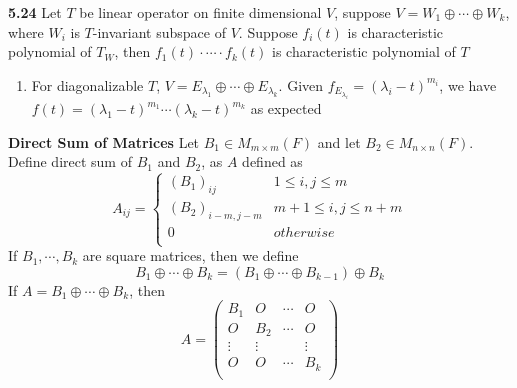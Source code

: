 \documentclass[11pt]{article}
\begin{document}
\begin{theorem*}
    \textbf{5.24} Let $T$ be linear operator on finite dimensional $V$, suppose $V = W_1 \oplus \cdots \oplus W_k$, where $W_i$ is $T$-invariant subspace of $V$. Suppose $f_i(t)$ is characteristic polynomial of $T_W$, then $f_1(t)\cdot \cdots \cdot f_k(t)$ is characteristic polynomial of $T$
    \begin{enumerate}
        \item For diagonalizable $T$, $V = E_{\lambda_1} \oplus \cdots \oplus E_{\lambda_k}$. Given $f_{E_{\lambda_i}} = (\lambda_i - t)^{m_i}$, we have $f(t) = (\lambda_1 - t)^{m_1} \cdots (\lambda_k -t)^{m_k}$ as expected 
    \end{enumerate}
\end{theorem*}

\begin{defn*}
    \textbf{Direct Sum of Matrices} Let $B_1 \in M_{m\times m}(F)$ and let $B_2 \in M_{n\times n}(F)$. Define direct sum of $B_1$ and $B_2$, as $A$ defined as 
    \[
        A_{ij} = 
        \begin{cases}
            (B_1)_{ij} & 1\leq i, j\leq m \\
            (B_2)_{i-m, j-m} & m+1\leq i,j\leq n+m \\
            0 & otherwise \\ 
        \end{cases}    
    \]
    If $B_1, \cdots, B_k$ are square matrices, then we define 
    \[
        B_1 \oplus \cdots \oplus B_k = (B_1\oplus \cdots \oplus B_{k-1}) \oplus B_k
    \]
    If $A = B_1 \oplus \cdots \oplus B_k$, then 
    \[
        A = 
        \begin{pmatrix}
            B_1 & O & \cdots & O \\ 
            O & B_2 & \cdots & O \\ 
            \vdots & \vdots & & \vdots \\
            O & O & \cdots & B_k \\ 
        \end{pmatrix}    
    \]
\end{defn*}
\end{document}
